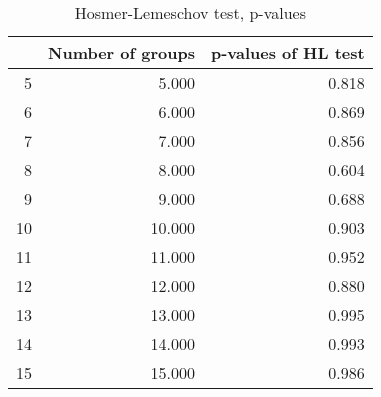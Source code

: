 \begin{table}[ht]
\centering
\begin{tabular}{rrr}
  \hline
 & Number of groups & p-values of HL test \\ 
  \hline
5 & 5.000 & 0.818 \\ 
  6 & 6.000 & 0.869 \\ 
  7 & 7.000 & 0.856 \\ 
  8 & 8.000 & 0.604 \\ 
  9 & 9.000 & 0.688 \\ 
  10 & 10.000 & 0.903 \\ 
  11 & 11.000 & 0.952 \\ 
  12 & 12.000 & 0.880 \\ 
  13 & 13.000 & 0.995 \\ 
  14 & 14.000 & 0.993 \\ 
  15 & 15.000 & 0.986 \\ 
   \hline
\end{tabular}
\caption{Hosmer-Lemeschov test, p-values} 
\end{table}
